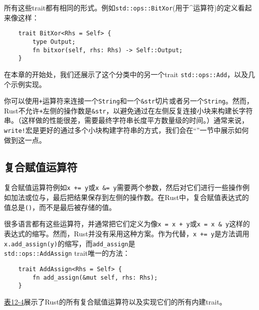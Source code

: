 所有这些trait都有相同的形式。例如\texttt{std::ops::BitXor}(用于\^{}运算符)的定义看起来像这样：
\begin{verbatim}
    trait BitXor<Rhs = Self> {
        type Output;
        fn bitxor(self, rhs: Rhs) -> Self::Output;
    }
\end{verbatim}

在本章的开始处，我们还展示了这个分类中的另一个trait \texttt{std::ops::Add}，以及几个示例实现。

你可以使用\texttt{+}运算符来连接一个\texttt{String}和一个\texttt{\&str}切片或者另一个\texttt{String}。然而，Rust不允许\texttt{+}左侧的操作数是\texttt{\&str}，以避免通过在左侧反复连接小块来构建长字符串。（这样做的性能很差，需要最终字符串长度平方数量级的时间。）通常来说，\texttt{write!}宏是更好的通过多个小块构建字符串的方式，我们会在“”一节中展示如何做到这一点。

\subsection{复合赋值运算符}\label{assign}
复合赋值运算符例如\texttt{x += y}或\texttt{x \&= y}需要两个参数，然后对它们进行一些操作例如加法或位与，最后把结果保存到左侧的操作数。在Rust中，复合赋值表达式的值总是\texttt{()}，而不是最后被存储的值。

很多语言都有这些运算符，并通常把它们定义为像\texttt{x = x + y}或\texttt{x = x \& y}这样的表达式的缩写。然而，Rust并没有采用这种方案。作为代替，\texttt{x += y}是方法调用\texttt{x.add\_assign(y)}的缩写，而\texttt{add\_assign}是\\
\texttt{std::ops::AddAssign} trait唯一的方法：
\begin{verbatim}
    trait AddAssign<Rhs = Self> {
        fn add_assign(&mut self, rhs: Rhs);
    }
\end{verbatim}

\hyperref[t12-4]{表12-4}展示了Rust的所有复合赋值运算符以及实现它们的所有内建trait。

